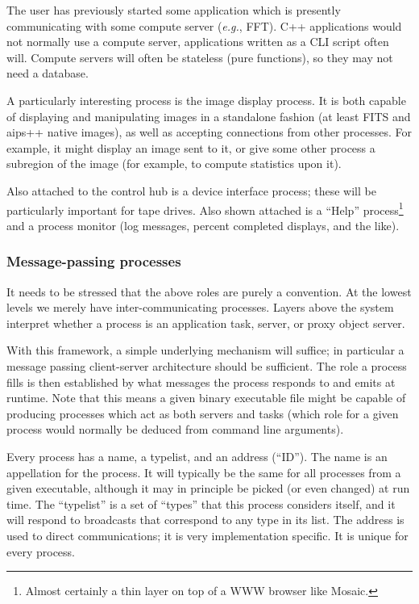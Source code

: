 The user has previously started some application which is presently
communicating with some compute server ({\em e.g.}, FFT). C++
applications would not normally use a compute server, applications
written as a CLI script often will. Compute servers will often be
stateless (pure functions), so they may not need a database.

A particularly interesting process is the image display process. It is
both capable of displaying and manipulating images in a standalone
fashion (at least FITS and {\sc aips++} native images), as well as
accepting connections from other processes. For example, it might
display an image sent to it, or give some other process a subregion of
the image (for example, to compute statistics upon it).

Also attached to the control hub is a device interface process; these
will be particularly important for tape drives. Also shown attached is
a ``Help'' process\footnote{Almost certainly a thin layer on top of a
WWW browser like Mosaic.} and a process monitor (log messages, percent
completed displays, and the like).

\subsubsection{Message-passing processes}

It needs to be stressed that the above roles are purely a convention.
At the lowest levels we merely have inter-communicating processes.
Layers above the system interpret whether a process is an application
task, server, or proxy object server.

With this framework, a simple underlying mechanism will suffice; in
particular a message passing client-server architecture should be
sufficient. The role a process fills is then established by what
messages the process responds to and emits at runtime. Note that this
means a given binary executable file might be capable of producing
processes which act as both servers and tasks (which role for a given
process would normally be deduced from command line arguments).

Every process has a name, a typelist, and an address (``ID''). The name
is an appellation for the process. It will typically be the same for
all processes from a given executable, although it may in principle be
picked (or even changed) at run time. The ``typelist'' is a set of
``types'' that this process considers itself, and it will respond to
broadcasts that correspond to any type in its list. The address is
used to direct communications; it is very implementation specific. It
is unique for every process.

